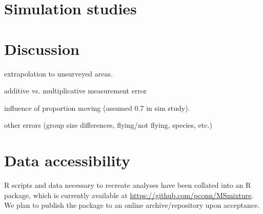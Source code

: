 \documentclass[12pt,fleqn]{article}
\begin{document}
\section{Simulation studies}

\section{Discussion}

extrapolation to unsurveyed areas.

additive vs. multiplicative measurement error \citep{BorchersEtAl2010}

influence of proportion moving (assumed 0.7 in sim study).

other errors (group size differences, flying/not flying, species, etc.)

\section{Data accessibility}
R scripts and data necessary to recreate analyses have been collated into an R package, which is currently available at \url{https://github.com/pconn/MSmixture}.  We plan to publish the package to an online archive/repository upon acceptance. \\




\end{document}

